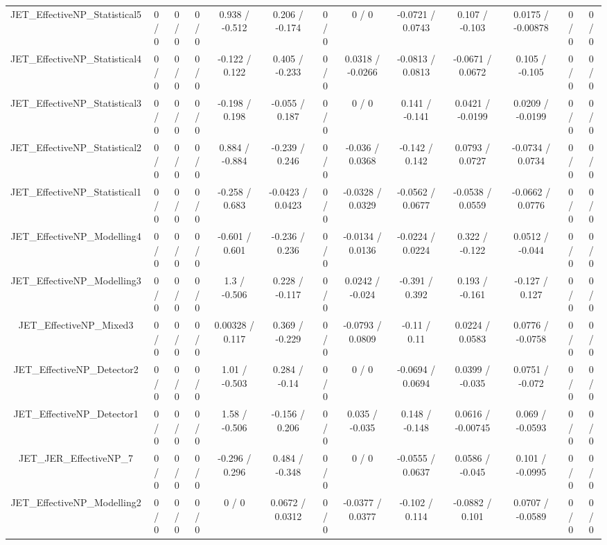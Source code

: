 \documentclass[10pt]{article}
\begin{document}
\begin{table}[htbp]
\begin{center}
\begin{tabular}{|c|c|c|c|c|c|c|c|c|c|c|c|c|}
  JET_EffectiveNP_Statistical5 & 0 / 0 & 0 / 0 & 0 / 0 & 0.938 / -0.512 & 0.206 / -0.174 & 0 / 0 & 0 / 0 & -0.0721 / 0.0743 & 0.107 / -0.103 & 0.0175 / -0.00878 & 0 / 0 & 0 / 0 \\ 
  JET_EffectiveNP_Statistical4 & 0 / 0 & 0 / 0 & 0 / 0 & -0.122 / 0.122 & 0.405 / -0.233 & 0 / 0 & 0.0318 / -0.0266 & -0.0813 / 0.0813 & -0.0671 / 0.0672 & 0.105 / -0.105 & 0 / 0 & 0 / 0 \\ 
  JET_EffectiveNP_Statistical3 & 0 / 0 & 0 / 0 & 0 / 0 & -0.198 / 0.198 & -0.055 / 0.187 & 0 / 0 & 0 / 0 & 0.141 / -0.141 & 0.0421 / -0.0199 & 0.0209 / -0.0199 & 0 / 0 & 0 / 0 \\ 
  JET_EffectiveNP_Statistical2 & 0 / 0 & 0 / 0 & 0 / 0 & 0.884 / -0.884 & -0.239 / 0.246 & 0 / 0 & -0.036 / 0.0368 & -0.142 / 0.142 & 0.0793 / 0.0727 & -0.0734 / 0.0734 & 0 / 0 & 0 / 0 \\ 
  JET_EffectiveNP_Statistical1 & 0 / 0 & 0 / 0 & 0 / 0 & -0.258 / 0.683 & -0.0423 / 0.0423 & 0 / 0 & -0.0328 / 0.0329 & -0.0562 / 0.0677 & -0.0538 / 0.0559 & -0.0662 / 0.0776 & 0 / 0 & 0 / 0 \\ 
  JET_EffectiveNP_Modelling4 & 0 / 0 & 0 / 0 & 0 / 0 & -0.601 / 0.601 & -0.236 / 0.236 & 0 / 0 & -0.0134 / 0.0136 & -0.0224 / 0.0224 & 0.322 / -0.122 & 0.0512 / -0.044 & 0 / 0 & 0 / 0 \\ 
  JET_EffectiveNP_Modelling3 & 0 / 0 & 0 / 0 & 0 / 0 & 1.3 / -0.506 & 0.228 / -0.117 & 0 / 0 & 0.0242 / -0.024 & -0.391 / 0.392 & 0.193 / -0.161 & -0.127 / 0.127 & 0 / 0 & 0 / 0 \\ 
  JET_EffectiveNP_Mixed3 & 0 / 0 & 0 / 0 & 0 / 0 & 0.00328 / 0.117 & 0.369 / -0.229 & 0 / 0 & -0.0793 / 0.0809 & -0.11 / 0.11 & 0.0224 / 0.0583 & 0.0776 / -0.0758 & 0 / 0 & 0 / 0 \\ 
  JET_EffectiveNP_Detector2 & 0 / 0 & 0 / 0 & 0 / 0 & 1.01 / -0.503 & 0.284 / -0.14 & 0 / 0 & 0 / 0 & -0.0694 / 0.0694 & 0.0399 / -0.035 & 0.0751 / -0.072 & 0 / 0 & 0 / 0 \\ 
  JET_EffectiveNP_Detector1 & 0 / 0 & 0 / 0 & 0 / 0 & 1.58 / -0.506 & -0.156 / 0.206 & 0 / 0 & 0.035 / -0.035 & 0.148 / -0.148 & 0.0616 / -0.00745 & 0.069 / -0.0593 & 0 / 0 & 0 / 0 \\ 
  JET_JER_EffectiveNP_7 & 0 / 0 & 0 / 0 & 0 / 0 & -0.296 / 0.296 & 0.484 / -0.348 & 0 / 0 & 0 / 0 & -0.0555 / 0.0637 & 0.0586 / -0.045 & 0.101 / -0.0995 & 0 / 0 & 0 / 0 \\ 
  JET_EffectiveNP_Modelling2 & 0 / 0 & 0 / 0 & 0 / 0 & 0 / 0 & 0.0672 / 0.0312 & 0 / 0 & -0.0377 / 0.0377 & -0.102 / 0.114 & -0.0882 / 0.101 & 0.0707 / -0.0589 & 0 / 0 & 0 / 0 \\ 

\end{tabular}
\end{center}
\end{table}
\end{document}
